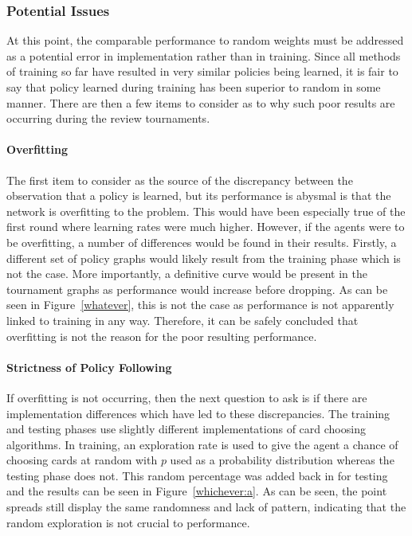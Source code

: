 
\subsubsection{Potential Issues}
\label{sec:findings-r2-potentialissues}

At this point,
the comparable performance to random weights must be addressed as a potential
error in implementation rather than in training.
%
Since all methods of training so far have resulted in very similar policies
being learned,
it is fair to say that policy learned during training has been superior to
random in some manner.
%
There are then a few items to consider as to why such poor results are occurring
during the review tournaments.


\paragraph{Overfitting}

The first item to consider as the source of the discrepancy between the
observation that a policy is learned,
but its performance is abysmal
is that the network is overfitting to the problem.
%
This would have been especially true of the first round where learning rates
were much higher.
%
However,
if the agents were to be overfitting,
a number of differences would be found in their results.
%
Firstly,
a different set of policy graphs would likely result from the training phase
which is not the case. %
%
More importantly,
a definitive curve would be present in the tournament graphs as performance
would increase before dropping.
%
As can be seen in Figure~\ref{whatever},
this is not the case
as performance is not apparently linked to training in any way.
%
Therefore, it can be safely concluded that overfitting is not the reason
for the poor resulting performance.

\paragraph{Strictness of Policy Following}

If overfitting is not occurring,
then the next question to ask is if there are implementation differences which
have led to these discrepancies.
%
The training and testing phases use slightly different implementations of 
card choosing algorithms.
%
In training,
an exploration rate is used to give the agent a chance of choosing cards at
random with $p$ used as a probability distribution
whereas the testing phase does not.
%
This random percentage was added back in for testing and the results can be seen
in Figure~\ref{whichever:a}.
%
As can be seen,
the point spreads still display the same randomness and lack of pattern,
indicating that the random exploration is not crucial to performance.

